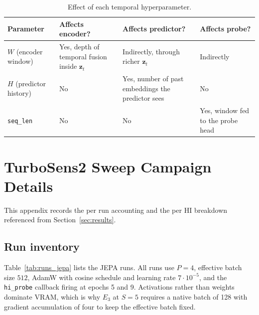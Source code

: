 \begin{table}[h]
    \centering
    \small
    \begin{tabular}{p{3.0cm}p{3.5cm}p{3.5cm}p{3.0cm}}
    \toprule
    Parameter & Affects encoder? & Affects predictor? & Affects probe? \\
    \midrule
    $W$ (encoder window) &
    Yes, depth of temporal fusion inside $\mathbf{z}_t$ &
    Indirectly, through richer $\mathbf{z}_t$ &
    Indirectly \\
    $H$ (predictor history) &
    No &
    Yes, number of past embeddings the predictor sees &
    No \\
    \texttt{seq\_len} &
    No &
    No &
    Yes, window fed to the probe head \\
    \bottomrule
    \end{tabular}
    \caption{Effect of each temporal hyperparameter.}
    \label{tab:temp_hyperparams}
\end{table}


\section{TurboSens2 Sweep Campaign Details}
\label{sec:campaign}

This appendix records the per run accounting and the per HI breakdown
referenced from Section~\ref{sec:results}.

\subsection{Run inventory}
\label{sec:run_inventory}

Table~\ref{tab:runs_jepa} lists the JEPA runs. All runs use $P{=}4$,
effective batch size $512$, AdamW with cosine schedule and learning
rate $7 \cdot 10^{-5}$, and the \texttt{hi\_probe} callback firing at
epochs 5 and 9. Activations rather than weights dominate VRAM, which is
why $E_3$ at $S{=}5$ requires a native batch of 128 with gradient
accumulation of four to keep the effective batch fixed.

